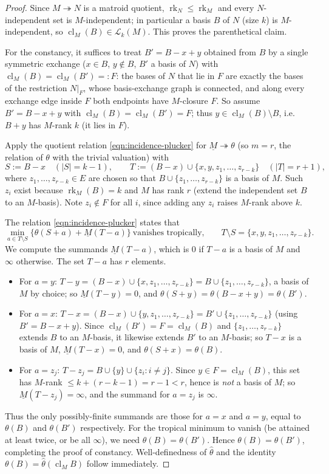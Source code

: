 \documentclass{article}
\theoremstyle{definition}
\newcommand{\rk}{\operatorname{rk}}
\newcommand{\cl}{\operatorname{cl}}
\newcommand{\onto}{\twoheadrightarrow}
\newcommand{\cLL}{\mathcal{L}}
\begin{document}
\begin{proof}
Since $M\onto N$ is a matroid quotient, $\rk_N\le\rk_M$ and every $N$-independent set is
$M$-independent; in particular a basis $B$ of $N$ (size $k$) is $M$-independent, so
$\cl_M(B)\in\cLL_k(M)$. This proves the parenthetical claim.

For the constancy, it suffices to treat $B'=B-x+y$ obtained from $B$ by a single symmetric exchange
($x\in B$, $y\notin B$, $B'$ a basis of $N$) with $\cl_M(B)=\cl_M(B')=:F$: the bases of $N$ that lie
in $F$ are exactly the bases of the restriction $N|_F$, whose basis-exchange graph is connected, and
along every exchange edge inside $F$ both endpoints have $M$-closure $F$. So assume $B'=B-x+y$ with
$\cl_M(B)=\cl_M(B')=F$; thus $y\in\cl_M(B)\setminus B$, i.e.\ $B+y$ has $M$-rank $k$ (it lies in $F$).

Apply the quotient relation \eqref{eqn:incidence-plucker} for $\underline M\onto\theta$ (so $m=r$,
the relation of $\theta$ with the trivial valuation) with
\[
  S:=B-x\quad(|S|=k-1),\qquad T:=(B-x)\cup\{x,y,z_1,\dots,z_{r-k}\}\quad(|T|=r+1),
\]
where $z_1,\dots,z_{r-k}\in E$ are chosen so that $B\cup\{z_1,\dots,z_{r-k}\}$ is a basis of $M$.
Such $z_i$ exist because $\rk_M(B)=k$ and $M$ has rank $r$ (extend the independent set $B$ to an
$M$-basis). Note $z_i\notin F$ for all $i$, since adding any $z_i$ raises $M$-rank above $k$.

The relation \eqref{eqn:incidence-plucker} states that
\[
  \min_{a\in T\setminus S}\bigl\{\theta(S+a)+\underline M(T-a)\bigr\}\ \text{vanishes tropically,}
  \qquad T\setminus S=\{x,y,z_1,\dots,z_{r-k}\}.
\]
We compute the summands $\underline M(T-a)$, which is $0$ if $T-a$ is a basis of $M$ and $\infty$
otherwise. The set $T-a$ has $r$ elements.
\begin{itemize}
\item For $a=y$: $T-y=(B-x)\cup\{x,z_1,\dots,z_{r-k}\}=B\cup\{z_1,\dots,z_{r-k}\}$, a basis of $M$
by choice; so $\underline M(T-y)=0$, and $\theta(S+y)=\theta(B-x+y)=\theta(B')$.
\item For $a=x$: $T-x=(B-x)\cup\{y,z_1,\dots,z_{r-k}\}=B'\cup\{z_1,\dots,z_{r-k}\}$ (using
$B'=B-x+y$). Since $\cl_M(B')=F=\cl_M(B)$ and $\{z_1,\dots,z_{r-k}\}$ extends $B$ to an $M$-basis,
it likewise extends $B'$ to an $M$-basis; so $T-x$ is a basis of $M$, $\underline M(T-x)=0$, and
$\theta(S+x)=\theta(B)$.
\item For $a=z_j$: $T-z_j=B\cup\{y\}\cup\{z_i:i\ne j\}$. Since $y\in F=\cl_M(B)$, this set has
$M$-rank $\le k+(r-k-1)=r-1<r$, hence is \emph{not} a basis of $M$; so $\underline M(T-z_j)=\infty$,
and the summand for $a=z_j$ is $\infty$.
\end{itemize}
Thus the only possibly-finite summands are those for $a=x$ and $a=y$, equal to $\theta(B)$ and
$\theta(B')$ respectively. For the tropical minimum to vanish (be attained at least twice, or be all
$\infty$), we need $\theta(B)=\theta(B')$. Hence $\theta(B)=\theta(B')$, completing the proof of
constancy. Well-definedness of $\widehat\theta$ and the identity $\theta(B)=\widehat\theta(\cl_M B)$
follow immediately.
\end{proof}
\end{document}

